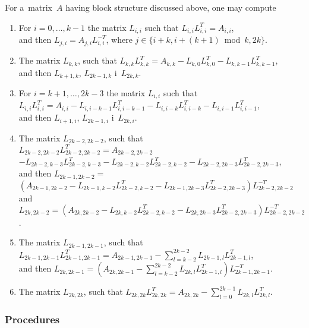 For a~matrix~$A$ having block structure discussed above, one may compute
\begin{enumerate}
  \item For $i=0,\ldots,k-1$ the matrix $L_{i,i}$ such that $L_{i,i}L_{i,i}^T=A_{i,i}$, \\
    and then $L_{j,i}=A_{j,i}L_{i,i}^{-T}$, where $j\in\{i+k,i+(k+1)\bmod k,2k\}$.
  \item The matrix $L_{k,k}$, such that
    $L_{k,k}L_{k,k}^T=A_{k,k}-L_{k,0}L_{k,0}^T-L_{k,k-1}L_{k,k-1}^T$, \\ and then
    $L_{k+1,k}$, $L_{2k-1,k}$ i~$L_{2k,k}$.
  \item For $i=k+1,\ldots,2k-3$ the matrix $L_{i,i}$ such that \\
    $L_{i,i}L_{i,i}^T=A_{i,i}-L_{i,i-k-1}L_{i,i-k-1}^T-L_{i,i-k}L_{i,i-k}^T-L_{i,i-1}L_{i,i-1}^T$, \\
    and then $L_{i+1,i}$, $L_{2k-1,i}$ i~$L_{2k,i}$.
  \item The matrix $L_{2k-2,2k-2}$, such that \\
    $L_{2k-2,2k-2}L_{2k-2,2k-2}^T=A_{2k-2,2k-2}$ \\
    $-L_{2k-2,k-3}L_{2k-2,k-3}^T-L_{2k-2,k-2}L_{2k-2,k-2}^T-L_{2k-2,2k-3}L_{2k-2,2k-3}^T$, \\
    and then $L_{2k-1,2k-2} =$ \\
    $(A_{2k-1,2k-2}-L_{2k-1,k-2}L_{2k-2,k-2}^T-L_{2k-1,2k-3}L_{2k-2,2k-3}^T)L_{2k-2,2k-2}^{-T}$ \\
    and~$L_{2k,2k-2}=
    (A_{2k,2k-2}-L_{2k,k-2}L_{2k-2,k-2}^T-L_{2k,2k-3}L_{2k-2,2k-3}^T)L_{2k-2,2k-2}^{-T}$.
  \item The matrix $L_{2k-1,2k-1}$, such that \\
    $L_{2k-1,2k-1}L_{2k-1,2k-1}^T=A_{2k-1,2k-1}-\sum_{l=k-2}^{2k-2}L_{2k-1,l}L_{2k-1,l}^T$, \\
    and then $L_{2k,2k-1} = (A_{2k,2k-1}-\sum_{l=k-2}^{2k-2}L_{2k,l}L_{2k-1,l}^T)L_{2k-1,2k-1}^{-T}$.
  \item The matrix $L_{2k,2k}$, such that
    $L_{2k,2k}L_{2k,2k}^T=A_{2k,2k}-\sum_{l=0}^{2k-1}L_{2k,l}L_{2k,l}^T$.
\end{enumerate}

\subsubsection*{Procedures}

\vspace{\bigskipamount}

